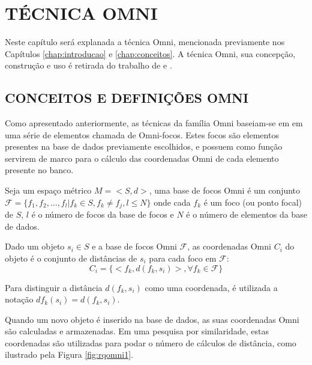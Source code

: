 \chapter{TÉCNICA OMNI}
\label{chap:omni}

Neste capítulo será explanada a técnica Omni, mencionada previamente nos Capítulos \ref{chap:introducao} e \ref{chap:conceitos}.
A técnica Omni, sua concepção, construção e uso é retirada do trabalho de \cite{Traina2001} e \cite{Traina2007}.


\section{CONCEITOS E DEFINIÇÕES OMNI}
\label{sec:defomni}
Como apresentado anteriormente, as técnicas da família Omni baseiam-se em em uma série de elementos chamada de 
Omni-focos. Estes focos são elementos presentes na base de dados previamente escolhidos, e possuem como função 
servirem de marco para o cálculo das coordenadas Omni de cada elemento presente no banco.

\begin{mydef}
 \label{def:omnifoco}
 Seja um espaço métrico $M = <S,d>$, uma base de focos Omni é um conjunto 
 $\mathscr{F} = \{f_1, f_2, ..., f_l | f_k \in S, f_k \neq f_j, l \leq N \}$ onde cada $f_k$ é um foco
 (ou ponto focal) de $S$, $l$ é o número de focos da base de focos e $N$ é o número de elementos da base de dados.
\end{mydef}

\begin {mydef}
 \label{def:omnicoord}
 Dado um objeto $s_i \in S$ e a base de focos Omni $\mathscr{F}$, as coordenadas Omni $C_i$ do objeto é o conjunto
 de distâncias de $s_i$ para cada foco em $\mathscr{F}$:
 \begin{equation}
  C_i = \{ <f_k, d(f_k, s_i)>, \forall f_k \in \mathscr{F} \}
 \end{equation}
\end {mydef}

Para distinguir a distância $d(f_k, s_i)$ como uma coordenada, é utilizada a notação $df_k(s_i) = d(f_k, s_i)$.\par
Quando um novo objeto é inserido na base de dados, as suas coordenadas Omni são calculadas e armazenadas. Em uma pesquisa por
similaridade, estas coordenadas são utilizadas para podar o número de cálculos de distância, como ilustrado pela Figura \ref{fig:rqomni1}.\par

